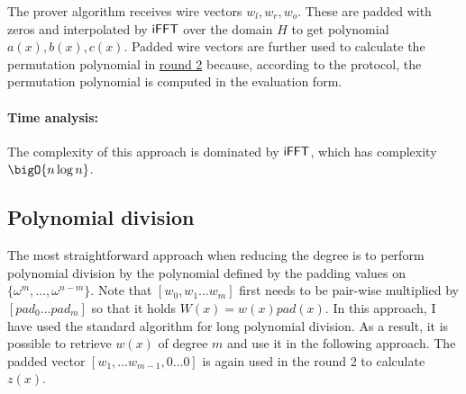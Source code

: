 The prover algorithm receives wire vectors $w_l, w_r, w_o$. These are padded with zeros and interpolated by $\mathsf{iFFT}$ over the domain $H$ to get polynomial $a(x), b(x), c(x)$. Padded wire vectors are further used to calculate the permutation polynomial in \hyperref[chap:round2]{round 2} because, according to the protocol, the permutation polynomial is computed in the evaluation form.

\paragraph{Time analysis:} The complexity of this approach is dominated by $\mathsf{iFFT}$, which has complexity $\bigO{n \log{n}}$.

\subsection{Polynomial division}
\begin{pchstack}
    \label{poly-div}
\end{pchstack}

The most straightforward approach when reducing the degree is to perform polynomial division by the polynomial defined by the padding values on $\{\omega^m, \ldots, \omega^{n-m}\}$. Note that $[w_0, w_1 \ldots w_{m}]$ first needs to be pair-wise multiplied by $[pad_0 \ldots pad_{m}]$ so that it holds $W(x) = w(x)pad(x)$. In this approach, I have used the standard algorithm for long polynomial division. As a result, it is possible to retrieve $w(x)$ of degree $m$ and use it in the following approach. The padded vector $[w_1, \ldots w_{m-1}, 0 \ldots 0]$ is again used in the round 2 to calculate $z(x)$. 


